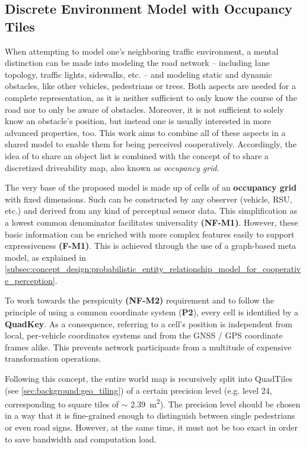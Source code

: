 \subsection{Discrete Environment Model with Occupancy Tiles}
\label{subsec:concept_design:discrete_environment_model_with_occupancy_tiles}

When attempting to model one's neighboring traffic environment, a mental distinction can be made into modeling the road network – including lane topology, traffic lights, sidewalks, etc. – and modeling static and dynamic obstacles, like other vehicles, pedestrians or trees. Both aspects are needed for a complete representation, as it is neither sufficient to only know the course of the road nor to only be aware of obstacles. Moreover, it is not sufficient to solely know an obstacle's position, but instead one is usually interested in more advanced properties, too. This work aims to combine all of these aspects in a shared model to enable them for being perceived cooperatively. Accordingly, the idea of \cite{Rauch2011} to share an object list is combined with the concept of \cite{liu2013motion} to share a discretized driveability map, also known as \textit{occupancy grid}. 
\par
\bigskip

The very base of the proposed model is made up of cells of an \textbf{occupancy grid} with fixed dimensions. Such can be constructed by any observer (vehicle, RSU, etc.) and derived from any kind of perceptual sensor data. This simplification as a lowest common denominator facilitates universality \textbf{(NF-M1)}. However, these basic information can be enriched with more complex features easily to support expressiveness \textbf{(F-M1)}. This is achieved through the use of a graph-based meta model, as explained in \cref{subsec:concept_design:probabilistic_entity_relationship_model_for_cooperative_perception}.

To work towards the perspicuity \textbf{(NF-M2)} requirement and to follow the principle of using a common coordinate system (\textbf{P2}), every cell is identified by a \textbf{QuadKey}. As a consequence, referring to a cell's position is independent from local, per-vehicle coordinates systems and from the GNSS / GPS coordinate frames alike. This prevents network participants from a multitude of expensive transformation operations.

Following this concept, the entire world map is recursively split into QuadTiles (see \cref{sec:background:geo_tiling}) of a certain precision level (e.g. level 24, corresponding to square tiles of $\sim$ \SI{2.39}{\square\meter}). The precision level should be chosen in a way that it is fine-grained enough to distinguish between single pedestrians or even road signs. However, at the same time, it must not be too exact in order to save bandwidth and computation load.

